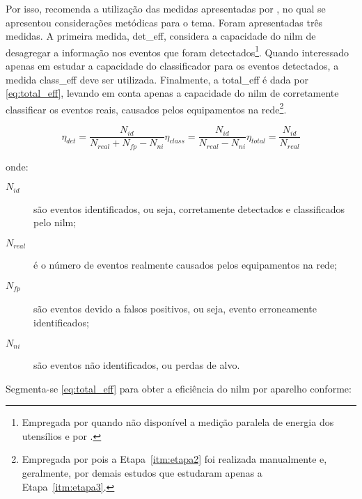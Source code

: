 Por isso, \cite{nilm_zeifman_review_2011} recomenda a utilização das
medidas apresentadas por \cite{nilm_liang_pt1_2010_34}, no qual se
apresentou considerações metódicas para o tema. Foram apresentadas
três medidas. A primeira medida, \gls{det_eff}, considera a capacidade
do \gls{nilm} de desagregar a informação nos eventos que foram
detectados\footnote{Empregada por \cite{nilm_hart_1992_8} quando não
disponível a medição paralela de energia dos utensílios e por
\cite{nilm_gupta_patel_2010_30}.}. Quando interessado apenas em
estudar a capacidade do classificador para os eventos detectados, a
medida \gls{class_eff} deve ser utilizada. Finalmente, a
\gls{total_eff} é dada por \ref{eq:total_eff}, levando em conta apenas
a capacidade do \gls{nilm} de corretamente classificar os eventos
reais, causados pelos equipamentos na rede\footnote{Empregada por
\cite{nilm_patel_2007_29,nilm_berges_2009_36} pois a
Etapa~\ref{itm:etapa2} foi realizada manualmente
\label{fn:patel_manual} e, geralmente, por demais estudos que
estudaram apenas a Etapa~\ref{itm:etapa3}.}.

\begin{subequations}\label{eq:eff}
\begin{equation}\label{eq:det_eff}
\eta_{det} = \frac{N_{id}}{N_{real} + N_{fp} - N_{ni}}
\end{equation}
\begin{equation}\label{eq:class_eff}
\eta_{class} = \frac{N_{id}}{N_{real} - N_{ni}}
\end{equation}
\begin{equation}\label{eq:total_eff}
\eta_{total} = \frac{N_{id}}{N_{real}}
\end{equation}
\end{subequations}

\noindent onde:  

\begin{description}
\item[$N_{id}$] são eventos identificados, ou seja, corretamente
detectados e classificados pelo \gls{nilm}; 
\item[$N_{real}$] é o número de eventos realmente causados pelos
equipamentos na rede;
\item[$N_{fp}$] são eventos devido a falsos positivos, ou seja,
evento erroneamente identificados;
\item[$N_{ni}$] são eventos não identificados, ou perdas de alvo.
\end{description}

Segmenta-se \ref{eq:total_eff} para obter a eficiência do \gls{nilm}
por aparelho conforme:

